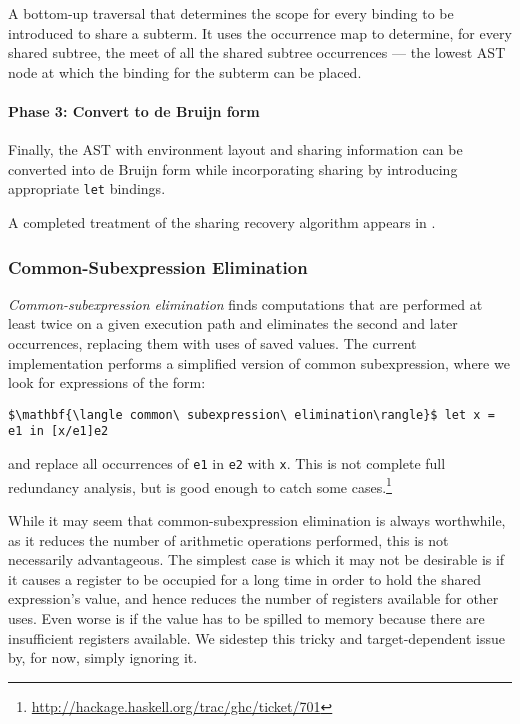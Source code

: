 A bottom-up traversal that determines the scope for every binding to be
introduced to share a subterm. It uses the occurrence map to determine, for
every shared subtree, the meet of all the shared subtree occurrences --- the
lowest AST node at which the binding for the subterm can be placed.

\paragraph{Phase 3: Convert to de Bruijn form}

Finally, the AST with environment layout and sharing information can be
converted into de Bruijn form while incorporating sharing by introducing
appropriate \texttt{let} bindings.

A completed treatment of the sharing recovery algorithm appears in \derp.


\subsubsection{Common-Subexpression Elimination}
\label{sec:cse}

\emph{Common-subexpression elimination} finds computations that are performed at
least twice on a given execution path and eliminates the second and later
occurrences, replacing them with uses of saved values. The current
implementation performs a simplified version of common subexpression, where we
look for expressions of the form:
%
\begin{lstlisting}[style=Haskell,mathescape,numbers=none]
$\mathbf{\langle common\ subexpression\ elimination\rangle}$ let x = e1 in [x/e1]e2
\end{lstlisting}
%
and replace all occurrences of \texttt{e1} in \texttt{e2} with \texttt{x}. This
is not complete full redundancy analysis, but is good enough to catch some
cases.\footnote{\url{http://hackage.haskell.org/trac/ghc/ticket/701}}

While it may seem that common-subexpression elimination is always worthwhile, as
it reduces the number of arithmetic operations performed, this is not
necessarily advantageous. The simplest case is which it may not be desirable is
if it causes a register to be occupied for a long time in order to hold the
shared expression's value, and hence reduces the number of registers available
for other uses. Even worse is if the value has to be spilled to memory because
there are insufficient registers available. We sidestep this tricky and
target-dependent issue by, for now, simply ignoring it.


